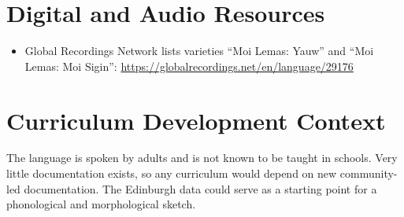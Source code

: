 \documentclass[12pt]{article}
\begin{document}
\section{Digital and Audio Resources}
\begin{itemize}
\item Global Recordings Network lists varieties ``Moi Lemas: Yauw'' and ``Moi Lemas: Moi Sigin'': \url{https://globalrecordings.net/en/language/29176}
\end{itemize}

\section{Curriculum Development Context}
The language is spoken by adults and is not known to be taught in schools. Very little documentation exists, so any curriculum would depend on new community-led documentation. The Edinburgh data could serve as a starting point for a phonological and morphological sketch.
\end{document}
